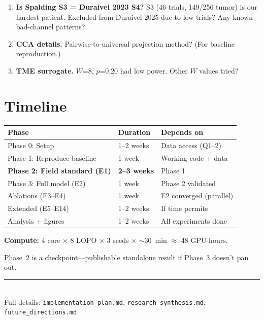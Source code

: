 \documentclass[11pt, letterpaper]{article}
\begin{document}
\begin{enumerate}[nosep, start=11]
  \item \textbf{Is Spalding S3 = Duraivel 2023 S4?} S3 (46 trials, 149/256 tumor) is our hardest patient. Excluded from Duraivel 2025 due to low trials? Any known bad-channel patterns?
  \item \textbf{CCA details.} Pairwise-to-universal projection method? (For baseline reproduction.)
  \item \textbf{TME surrogate.} $W$=8, $p$=0.20 had low power. Other $W$ values tried?
\end{enumerate}


\section{Timeline}
\label{sec:timeline}

\begin{table}[h]
\centering\small
\begin{tabular}{@{}lll@{}}
\toprule
\textbf{Phase} & \textbf{Duration} & \textbf{Depends on} \\
\midrule
Phase 0: Setup              & 1--2 weeks & Data access (Q1--2) \\
Phase 1: Reproduce baseline & 1 week     & Working code + data \\
\textbf{Phase 2: Field standard (E1)} & \textbf{2--3 weeks} & Phase 1 \\
Phase 3: Full model (E2)    & 1 week     & Phase 2 validated \\
Ablations (E3--E4)          & 1 week     & E2 converged (parallel) \\
Extended (E5--E14)          & 1--2 weeks & If time permits \\
Analysis + figures          & 1--2 weeks & All experiments done \\
\bottomrule
\end{tabular}
\end{table}

\textbf{Compute:} 4 core $\times$ 8 LOPO $\times$ 3 seeds $\times$ ${\sim}$30~min $\approx$ 48 GPU-hours.

Phase~2 is a checkpoint---publishable standalone result if Phase~3 doesn't pan out.


\vfill
\begin{center}
\textcolor{gray!50}{\rule{8cm}{0.4pt}}\\[6pt]
\textcolor{gray!60}{\small Full details: \texttt{implementation\_plan.md}, \texttt{research\_synthesis.md}, \texttt{future\_directions.md}}
\end{center}
\end{document}
